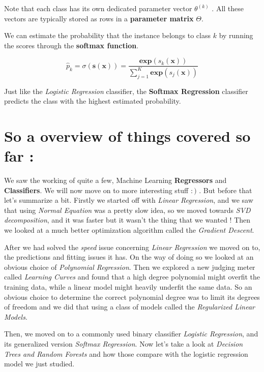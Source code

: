 \documentclass[11pt, a4paper]{book}
\begin{document}
Note that each class has its own dedicated parameter vector
\(\theta^{(k)}\) . All these vectors are typically stored as rows in a
\textbf{parameter matrix} \(\Theta\).

We can estimate the probability that the instance belongs to class \(k\)
by running the scores through the \textbf{softmax function}.

\[\hat{p}_{k} = \sigma(\mathbf{s(x)}) = \frac{\mathbf{exp}(s_k(\mathbf{x}))}{\sum_{j=1}^{K}\mathbf{exp}(s_j(\mathbf{x}))}\]

Just like the \emph{Logistic Regression} classifier, the \textbf{Softmax
Regression} classifier predicts the class with the highest estimated
probability.

    \hypertarget{so-a-overview-of-things-covered-so-far}{%
\section{So a overview of things covered so far
:}\label{so-a-overview-of-things-covered-so-far}}

We saw the working of quite a few, Machine Learning \textbf{Regressors}
and \textbf{Classifiers}. We will now move on to more interesting stuff
\(:)\) . But before that let's summarize a bit. Firstly we started off
with \emph{Linear Regression}, and we saw that using \emph{Normal
Equation} was a pretty slow idea, so we moved towards \emph{SVD
decomposition}, and it was faster but it wasn't the thing that we
wanted ! Then we looked at a much better optimization algorithm called
the \emph{Gradient Descent}.

After we had solved the \emph{speed} issue concerning \emph{Linear
Regression} we moved on to, the predictions and fitting issues it has.
On the way of doing so we looked at an obvious choice of
\emph{Polynomial Regression}. Then we explored a new judging meter called
\emph{Learning Curves} and found that a high degree polynomial might
overfit the training data, while a linear model might heavily underfit
the same data. So an obvious choice to determine the correct polynomial
degree was to limit its degrees of freedom and we did that using a class
of models called the \emph{Regularized Linear Models}.

Then, we moved on to a commonly used binary classifier \emph{Logistic
Regression}, and its generalized version \emph{Softmax Regression}. Now
let's take a look at \emph{Decision Trees and Random Forests} and how
those compare with the logistic regression model we just studied.
\end{document}
